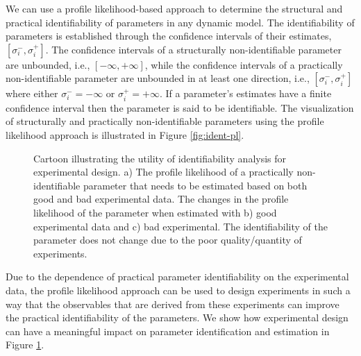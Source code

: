 \documentclass[10pt]{report}
\begin{document}
	We can use a profile likelihood-based approach to determine the structural and practical identifiability of parameters in any dynamic model. The identifiability of parameters is established through the confidence intervals of their estimates, $\left[\sigma_{i}^-,\sigma_{i}^+\right]$. The confidence intervals of a structurally non-identifiable parameter are unbounded, i.e., $\left[-\infty, +\infty\right]$, while the confidence intervals of a practically non-identifiable parameter are unbounded in at least one direction, i.e., $\left[\sigma_{i}^-,\sigma_{i}^+\right]$ where either $\sigma_{i}^- = -\infty$ or $\sigma_{i}^+ = +\infty$. If a parameter's estimates have a finite confidence interval then the parameter is said to be identifiable. The visualization of structurally and practically non-identifiable parameters using the profile likelihood approach is illustrated in Figure \ref{fig:ident-pl}. 
		
	\begin{figure}[!tbhp]
		\caption{Cartoon illustrating the utility of identifiability analysis for experimental design. a) The profile likelihood of a practically non-identifiable parameter that needs to be estimated based on both good and bad experimental data. The changes in the profile likelihood of the parameter when estimated with b) good experimental data and c) bad experimental. The identifiability of the parameter does not change due to the poor quality/quantity of experiments.}\label{fig:edwithpl}
	\end{figure}

	Due to the dependence of practical parameter identifiability on the experimental data, the profile likelihood approach can be used to design experiments in such a way that the observables that are derived from these experiments can improve the practical identifiability of the parameters. We show how experimental design can have a meaningful impact on parameter identification and estimation in Figure \ref{fig:edwithpl}.
	
\end{document}

